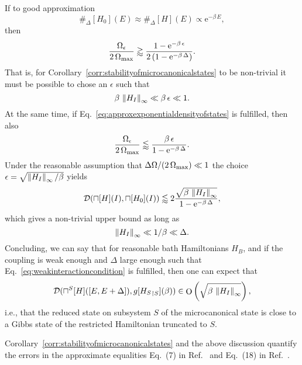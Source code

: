 \documentclass[a4paper,12pt,listof=totoc,index=totoc,bibliography=totoc,headsepline=false,headings=normal,BCOR16.153846mm,DIV12,headinclude,twoside,cleardoublepage=empty,numbers=noenddot,final]{scrreprt}
\theoremstyle{mystyle}
\numberwithin{equation}{section}
\numberwithin{figure}{section}
\numberwithin{lemma}{section}
\numberwithin{theorem}{section}
\numberwithin{corollary}{section}
\numberwithin{definition}{section}
\numberwithin{conjecture}{section}
\numberwithin{observation}{section}
\newcommand{\+}{\mkern2mu}
\newcommand{\texteqref}[1]{Eq.~\eqref{#1}}
\renewcommand{\max}{\mathchoice{\operatorname*{max}}{\operatorname*{max}}{\mathrm{max}}{\mathrm{max}}} %
\renewcommand{\H}{H}
\newcommand{\rhog}{g}
\newcommand{\rhomc}{{\sqcap}}
\newcommand{\norm}[2][]{
  \ifthenelse{\equal{#1}{}}
    {\left\| {#2} \right\|}
    {\ifthenelse{\equal{#1}{uinv}}
      {\left\vert\kern-0.25ex\left\vert\kern-0.25ex\left\vert {#2} \right\vert\kern-0.25ex\right\vert\kern-0.25ex\right\vert}
      {\left\| {#2} \right\|_{#1}}
    }
}
\newcommand{\tracedistance}[3][]{
  \ifthenelse{\equal{#2}{}}
  {\ifthenelse{\equal{#3}{}}
    {\mathcal{D}_{#1}}{}
  }{
    \ifthenelse{\equal{#1}{}}
    {\operatorname{\mathcal{D}}(#2,#3)}
    {\operatorname{\mathcal{D}}_{#1}(#2,#3)}
  }
}
\DeclareMathOperator{\landauO}{O}
\newcommand{\trunc}[2]{{#1}_{\upharpoonright \mathnormal{#2}}}
\newcommand{\e}{\mathrm{e}}
\DeclareMathOperator{\1}{\mathds{1}}
\begin{document}
If to good approximation
\begin{equation} \label{eq:approxexponentialdensityofstates}
  \#_\Delta[\H_0](E) \approx \#_\Delta[\H](E) \propto \e^{-\beta\,E} ,
\end{equation}
then \cite[Appendix H]{Riera2012}
\begin{equation}
  \frac{\Omega_\epsilon}{2\,\Omega_{\max}} \gtrapprox \frac{1-\e^{-\beta\,\epsilon}}{2\,(1-\e^{-\beta\,\Delta})} .
\end{equation}
That is, for Corollary~\ref{corr:stabilityofmicrocanonicalstates} to be non-trivial it must be possible to chose an $\epsilon$ such that
\begin{equation}
  \beta\,\norm[\infty]{\H_I} \ll \beta\,\epsilon \ll 1 .
\end{equation}
At the same time, if \texteqref{eq:approxexponentialdensityofstates} is fulfilled, then also \cite[Appendix H]{Riera2012}
\begin{equation}
  \frac{\Omega_\epsilon}{2\,\Omega_{\max}} \lessapprox \frac{\beta\,\epsilon}{1-\e^{-\beta\,\Delta}} .
\end{equation}
Under the reasonable assumption that $\Delta\Omega/(2\,\Omega_{\max}) \ll 1$ the choice $\epsilon = \sqrt{\norm[\infty]{\H_I}/\beta}$ yields
\begin{equation}
  \tracedistance{\rhomc[\H](I)}{\rhomc[\H_0](I)} \lessapprox 2 \frac{\sqrt{\beta\,\norm[\infty]{\H_I}}}{1-\e^{-\beta\,\Delta}} ,
\end{equation}
which gives a non-trivial upper bound as long as
\begin{equation} \label{eq:weakinteractioncondition}
  \norm[\infty]{\H_I} \ll 1/\beta \ll \Delta .
\end{equation}
Concluding, we can say that for reasonable bath Hamiltonians $\H_B$, and if the coupling is weak enough and $\Delta$ large enough such that \texteqref{eq:weakinteractioncondition} is fulfilled, then one can expect that
\begin{equation} \label{eq:expectedorderupperboundondeviationfromlocalthermal}
  \tracedistance{\rhomc^S[\H]([E,E+\Delta])}{\rhog[\trunc{\H_S}S](\beta)} \in \landauO\left(\sqrt{\beta\,\norm[\infty]{H_I}}\right) ,
\end{equation}
i.e., that the reduced state on subsystem $S$ of the microcanonical state is close to a Gibbs state of the restricted Hamiltonian truncated to $S$.

Corollary~\ref{corr:stabilityofmicrocanonicalstates} and the above discussion quantify the errors in the approximate equalities Eq.~(7) in Ref.~\cite{Popescu05} and Eq.~(18) in Ref.~\cite{Goldstein06}.
\end{document}
